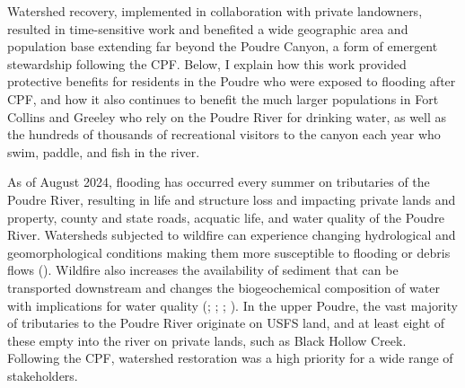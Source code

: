 \documentclass[
]{article}
\begin{document}
Watershed recovery, implemented in collaboration with private landowners, resulted in time-sensitive work and benefited a wide geographic area and population base extending far beyond the Poudre Canyon, a form of emergent stewardship following the CPF. Below, I explain how this work provided protective benefits for residents in the Poudre who were exposed to flooding after CPF, and how it also continues to benefit the much larger populations in Fort Collins and Greeley who rely on the Poudre River for drinking water, as well as the hundreds of thousands of recreational visitors to the canyon each year who swim, paddle, and fish in the river.

As of August 2024, flooding has occurred every summer on tributaries of the Poudre River, resulting in life and structure loss and impacting private lands and property, county and state roads, acquatic life, and water quality of the Poudre River. Watersheds subjected to wildfire can experience changing hydrological and geomorphological conditions making them more susceptible to flooding or debris flows (). Wildfire also increases the availability of sediment that can be transported downstream and changes the biogeochemical composition of water with implications for water quality (; ; ; ). In the upper Poudre, the vast majority of tributaries to the Poudre River originate on USFS land, and at least eight of these empty into the river on private lands, such as Black Hollow Creek. Following the CPF, watershed restoration was a high priority for a wide range of stakeholders.
\end{document}
